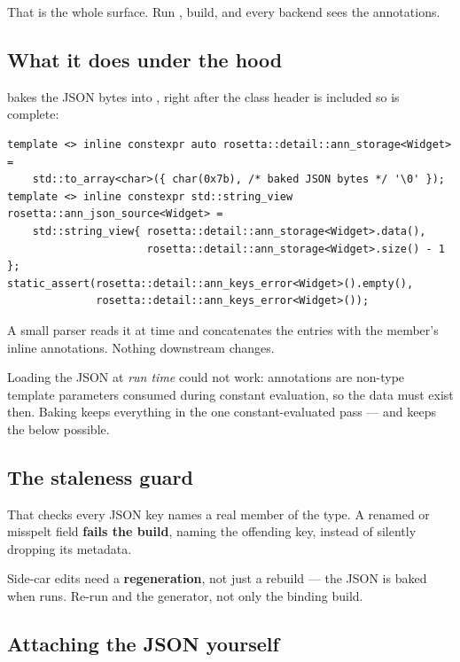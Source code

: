 That is the whole surface. Run , build, and every backend
sees the annotations.

\subsection{What it does under the hood}

 bakes the JSON bytes into , right after the
class header is included so  is complete:

\begin{lstlisting}[style=cpp]
template <> inline constexpr auto rosetta::detail::ann_storage<Widget> =
    std::to_array<char>({ char(0x7b), /* baked JSON bytes */ '\0' });
template <> inline constexpr std::string_view rosetta::ann_json_source<Widget> =
    std::string_view{ rosetta::detail::ann_storage<Widget>.data(),
                      rosetta::detail::ann_storage<Widget>.size() - 1 };
static_assert(rosetta::detail::ann_keys_error<Widget>().empty(),
              rosetta::detail::ann_keys_error<Widget>());
\end{lstlisting}

A small  parser reads it at  time and concatenates
the entries with the member's inline annotations. Nothing downstream changes.

Loading the JSON at \emph{run time} could not work: annotations are non-type
template parameters consumed during constant evaluation, so the data must exist
then. Baking keeps everything in the one constant-evaluated pass --- and keeps
the  below possible.

\subsection{The staleness guard}

That  checks every JSON key names a real member of the
type. A renamed or misspelt field \textbf{fails the build}, naming the offending
key, instead of silently dropping its metadata.

\begin{warn}
Side-car edits need a \textbf{regeneration}, not just a rebuild --- the JSON is
baked when  runs. Re-run  and the
generator, not only the binding build.
\end{warn}

\subsection{Attaching the JSON yourself}

